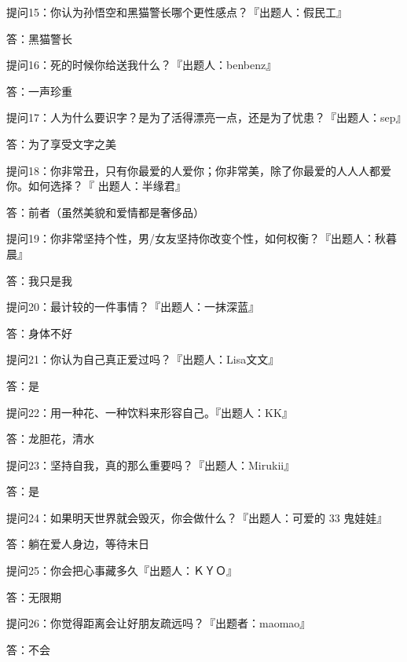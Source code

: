 		\vspace{1em}
		提问15：你认为孙悟空和黑猫警长哪个更性感点？『出题人：假民工』\par
		答：黑猫警长

		\vspace{1em}
		提问16：死的时候你给送我什么？『出题人：benbenz』\par
		答：一声珍重

		\vspace{1em}
		提问17：人为什么要识字？是为了活得漂亮一点，还是为了忧患？『出题人：sep』\par
		答：为了享受文字之美

		\vspace{1em}
		提问18：你非常丑，只有你最爱的人爱你；你非常美，除了你最爱的人人人都爱你。如何选择？『
				出题人：半缘君』\par
		答：前者（虽然美貌和爱情都是奢侈品）

		\vspace{1em}
		提问19：你非常坚持个性，男/女友坚持你改变个性，如何权衡？『出题人：秋暮晨』\par
		答：我只是我

		\vspace{1em}
		提问20：最计较的一件事情？『出题人：一抹深蓝』\par
		答：身体不好

		\vspace{1em}
		提问21：你认为自己真正爱过吗？『出题人：Lisa文文』\par
		答：是

		\vspace{1em}
		提问22：用一种花、一种饮料来形容自己。『出题人：KK』\par
		答：龙胆花，清水

		\vspace{1em}
		提问23：坚持自我，真的那么重要吗？『出题人：Mirukii』\par
		答：是

		\vspace{1em}
		提问24：如果明天世界就会毁灭，你会做什么？『出题人：可爱的 33 鬼娃娃』\par
		答：躺在爱人身边，等待末日

		\vspace{1em}
		提问25：你会把心事藏多久『出题人：ＫＹＯ』\par
		答：无限期

		\vspace{1em}
		提问26：你觉得距离会让好朋友疏远吗？『出题者：maomao』\par
		答：不会

